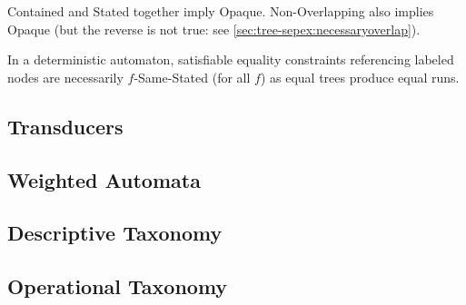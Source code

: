 Contained and Stated together imply Opaque.  Non-Overlapping also implies
Opaque (but the reverse is not true: see
\autoref{sec:tree-sepex:necessaryoverlap}).

In a deterministic automaton, satisfiable equality constraints referencing
labeled nodes are necessarily $f$-Same-Stated (for all $f$) as equal trees
produce equal runs.

\subsection{Transducers}

\subsection{Weighted Automata}

\subsection{Descriptive Taxonomy}

\subsection{Operational Taxonomy}
